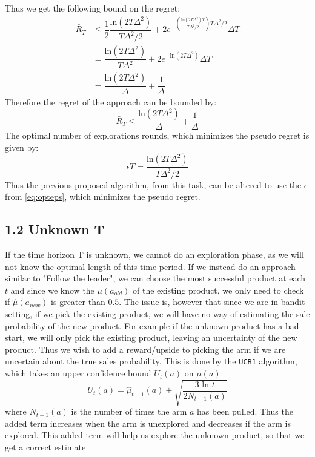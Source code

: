 \documentclass{article}
\begin{document}
Thus we get the following bound on the regret:
\begin{align}
\bar{R}_T &\leq \dfrac{1}{2} \dfrac{\text{ln}(2T \Delta^2 )}{T \Delta^2 / 2} + 2 e^{ - \left(\frac{\text{ln}(2T \Delta^2 ) T}{T \Delta^2 / 2} \right) T \Delta^2 / 2 } \Delta T \\
&= \dfrac{\text{ln}(2T \Delta^2 )}{T \Delta^2} + 2 e^{ - \text{ln}(2T \Delta^2 )  } \Delta T \\
&=  \dfrac{\text{ln}(2T\Delta^2)}{\Delta} + \dfrac{1}{\Delta} 
\end{align}
Therefore the regret of the approach can be bounded by:
\begin{equation}
\bar{R}_T \leq \dfrac{\text{ln}(2T\Delta^2)}{\Delta} + \dfrac{1}{\Delta} 
\end{equation}
The optimal number of explorations rounds, which minimizes the pseudo regret is given by: 
\begin{equation}
\label{eq:opteps}
\epsilon T = \dfrac{\text{ln}(2T \Delta^2 )}{T \Delta^2 / 2}
\end{equation}
Thus the previous proposed algorithm, from this task, can be altered to use the $\epsilon$ from \eqref{eq:opteps}, which minimizes the pseudo regret. 
\subsection{1.2 Unknown T}
If the time horizon T is unknown, we cannot do an exploration phase, as we will not know the optimal length of this time period. If we instead do an approach similar to "Follow the leader", we can choose the most successful product at each $t$ and since we know the $\mu(a_{old})$ of the existing product, we only need to check if $\hat{\mu}(a_{new})$ is greater than $0.5$. The issue is, however that since we are in bandit setting, if we pick the existing product, we will have no way of estimating the sale probability of the new product. For example if the unknown product has a bad start, we will only pick the existing product, leaving an uncertainty of the new product. Thus we wish to add a reward/upside to picking the arm if we are uncertain about the true sales probability. This is done by the \texttt{UCB1} algorithm, which takes an upper confidence bound $U_t(a)$ on $\mu(a)$:
\begin{equation}
U_t(a) = \hat{\mu}_{t-1}(a) + \sqrt{\dfrac{3 \text{ ln } t}{2 N_{t-1}(a)}}
\end{equation}
where $N_{t-1}(a)$ is the number of times the arm $a$ has been pulled. Thus the added term increases when the arm is unexplored and decreases if the arm is explored. This added term will help us explore the unknown product, so that we get a correct estimate 
\end{document}
